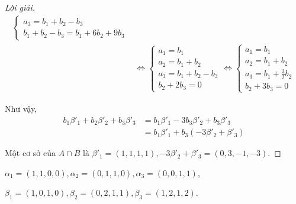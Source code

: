 \documentclass[class=linearalgebra,crop=false]{standalone}
\begin{document}
\begin{proof}[Lời giải]
\begin{align*}
\begin{cases}
            a_{3} = b_{1} + b_{2} - b_{3} \\
            b_{1} + b_{2} - b_{3} = b_{1} + 6b_{2} + 9b_{3}
        \end{cases}       \\
         & \Longleftrightarrow\begin{cases}
                                  a_{1} = b_{1}                 \\
                                  a_{2} = b_{1} + b_{2}         \\
                                  a_{3} = b_{1} + b_{2} - b_{3} \\
                                  b_{2} + 2b_{3} = 0
                              \end{cases}
        \Longleftrightarrow
        \begin{cases}
            a_{1} = b_{1}                    \\
            a_{2} = b_{1} + b_{2}            \\
            a_{3} = b_{1} + \frac{3}{2}b_{2} \\
            b_{2} + 3b_{3} = 0
        \end{cases}
    \end{align*}
    \par Như vậy,
    \begin{align*}
        b_{1}\beta'_{1} + b_{2}\beta'_{2} + b_{3}\beta'_{3}
         & = b_{1}\beta'_{1} - 3b_{3}\beta'_{2} + b_{3}\beta'_{3} \\
         & = b_{1}\beta'_{1} + b_{3}(-3\beta'_{2} + \beta'_{3})
    \end{align*}
    \par Một cơ sở của $A\cap B$ là $\beta'_{1} = (1,1,1,1), -3\beta'_{2} + \beta'_{3} = (0, 3, -1, -3)$.
\end{proof}

\begin{exercise}$\alpha_{1} = (1,1,0,0), \alpha_{2} = (0,1,1,0), \alpha_{3} = (0,0,1,1)$,
    \par $\beta_{1} = (1,0,1,0), \beta_{2} = (0,2,1,1), \beta_{3} = (1,2,1,2)$.
\end{exercise}
\end{document}
